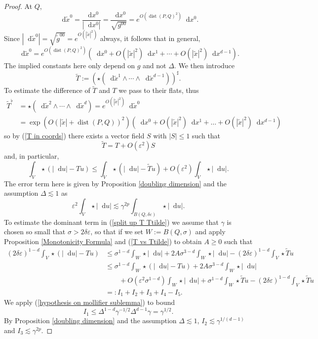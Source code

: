 \documentclass[reqno,12pt,letterpaper]{amsart}
\newcommand*\dif{\mathop{}\!\mathrm{d}}
\DeclareMathOperator{\dist}{dist}
\theoremstyle{definition}
\numberwithin{equation}{section}
\begin{document}
\begin{proof}
At $Q$,
$$\dif \tilde x^0 = \frac{\dif x^0}{|\dif x^0|} = \frac{\dif x^0}{\sqrt{g^{00}}} = e^{O(\dist(P, Q)^2)} \dif x^0.$$
Since $|\dif \tilde x^0| = \sqrt{\tilde g^{00}} = e^{O(|\tilde x|^2)}$ always, it follows that in general,
$$\dif \tilde x^0 = e^{O(\dist(P, Q)^2)}\left(\dif x^0 + O(|\tilde x|^2) \dif x^1 + \cdots + O(|\tilde x|^2) \dif x^{d-1}\right).$$
The implied constants here only depend on $g$ and not $\Delta$.
We then introduce
$$\tilde T := (\star (\dif \tilde x^1 \wedge \cdots \wedge \dif \tilde x^{d-1}))^\sharp.$$
To estimate the difference of $\tilde T$ and $T$ we pass to their flats, thus
\begin{align*}
\tilde T^\flat &= \star(\dif \tilde x^2 \wedge \cdots \wedge \dif \tilde x^d) = e^{O(|\tilde x|^2)} \dif \tilde x^0 \\
&= \exp\left(O(|\tilde x| + \dist(P, Q))^2\right) \left(\dif x^0 + O(|\tilde x|^2) \dif x^1 + \dots + O(|\tilde x|^2) \dif x^{d-1}\right)
\end{align*}
so by (\ref{T in coords}) there exists a vector field $S$ with $|S| \leq 1$ such that
\begin{equation}\label{T vs Ttilde}
\tilde T = T + O(\varepsilon^2)S
\end{equation}
and, in particular,
\begin{equation}\label{split up T Ttilde}
\int_V \star (|\dif u| - Tu) \leq \int_V \star (|\dif u| - \tilde Tu) + O(\varepsilon^2) \int_V \star |\dif u|.
\end{equation}
The error term here is given by Proposition \ref{doubling dimension} and the assumption $\Delta \lesssim 1$ as
$$\varepsilon^2 \int_V \star |\dif u| \lesssim \gamma^{2p} \int_{B(Q, \delta\varepsilon)} \star |\dif u|.$$
To estimate the dominant term in (\ref{split up T Ttilde}) we assume that $\gamma$ is chosen so small that $\sigma > 2\delta\varepsilon$, so that if we set $W := B(Q, \sigma)$ and apply Proposition \ref{Monotonicity Formula} and (\ref{T vs Ttilde}) to obtain $A \geq 0$ such that
\begin{align*}
(2\delta\varepsilon)^{1 - d} \int_V \star(|\dif u| - Tu)
&\leq \sigma^{1 - d}\int_W \star |\dif u| + 2A\sigma^{3 - d} \int_W \star |\dif u| - (2\delta\varepsilon)^{1 - d}\int_V \star \tilde Tu\\
&\leq \sigma^{1 - d}\int_W \star(|\dif u| - Tu) + 2A\sigma^{3 - d} \int_W \star |\dif u| \\
&\qquad + O(\varepsilon^2 \sigma^{1 - d}) \int_W \star |\dif u| + \sigma^{1 - d}\int_W \star \tilde Tu - (2\delta\varepsilon)^{1 - d}\int_V \star \tilde Tu\\
&=: I_1 + I_2 + I_3 + I_4 - I_5.
\end{align*}
We apply (\ref{hypothesis on mollifier sublemma}) to bound
$$I_1 \leq \Delta^{1 - d} \gamma^{-1/2} \Delta^{d - 1} \gamma = \gamma^{1/2}.$$
By Proposition \ref{doubling dimension} and the assumption $\Delta \lesssim 1$, $I_2 \lesssim \gamma^{1/(d - 1)}$ and $I_3 \lesssim \gamma^{2p}$.


\end{proof}
\end{document}
